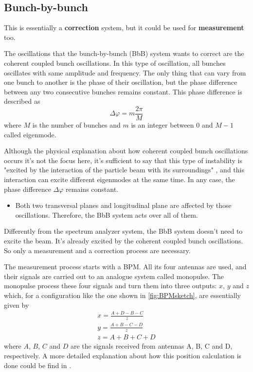 \subsection{Bunch-by-bunch}
This is essentially a \textbf{correction} system, but it could be used for \textbf{measurement} too.

The oscillations that the bunch-by-bunch (BbB) system wants to correct are the coherent coupled bunch oscillations. In this type of oscillation, all bunches oscillates with same amplitude and frequency. The only thing that can vary from one bunch to another is the phase of their oscillation, but the phase difference between any two consecutive bunches remains constant. This phase difference is described as
\begin{equation}
	\Delta \varphi = m \frac{2\pi}{M}
\end{equation}
where $M$ is the number of bunches and $m$ is an integer between 0 and $M-1$ called eigenmode.

Although the physical explanation about how coherent coupled bunch oscillations occurs it's not the focus here, it's sufficient to say that this type of instability is "excited by the interaction of the particle beam with its surroundings" \cite{lonza}, and this interaction can excite different eigenmodes at the same time. In any case, the phase difference $\Delta \varphi$ remains constant.

\begin{itemize}
	\item Both two transversal planes and longitudinal plane are affected by those oscillations. Therefore, the BbB system acts over all of them.
\end{itemize}

Differently from the spectrum analyzer system, the BbB system doesn't need to excite the beam. It's already excited by the coherent coupled bunch oscillations. So only a measurement and a correction process are necessary.

The measurement process starts with a BPM. All its four antennas are used, and their signals are carried out to an analogue system called monopulse. The monopulse process these four signals and turn them into three outputs: $x$, $y$ and $z$ which, for a configuration like the one shown in \autoref{fig:BPMsketch}, are essentially given by
\begin{align}
	x = \frac{A+D-B-C}{z}\\
	y = \frac{A+B-C-D}{z}\\
	z = A+B+C+D
\end{align}
where $A$, $B$, $C$ and $D$ are the signals received from antennas A, B, C and D, respectively. A more detailed explanation about how this position calculation is done could be find in \cite{digBPMCalculation}.

